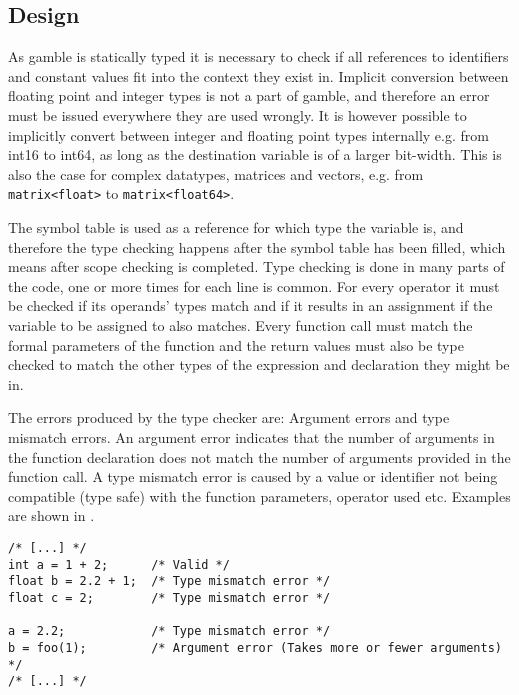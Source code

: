 \subsection*{Design}
As \gls{gamble} is statically typed it is necessary to check if all references to identifiers and constant values fit into the context they exist in. 
Implicit conversion between floating point and integer types is not a part of \gls{gamble}, and therefore an error must be issued everywhere they are used wrongly. 
It is however possible to implicitly convert between integer and floating point types internally e.g. from int16 to int64, as long as the destination variable is of a larger bit-width.
This is also the case for complex datatypes, matrices and vectors, e.g. from \texttt{matrix<float>} to \texttt{matrix<float64>}. 

The symbol table is used as a reference for which type the variable is, and therefore the type checking happens after the symbol table has been filled, which means after scope checking is completed. 
Type checking is done in many parts of the code, one or more times for each line is common. 
For every operator it must be checked if its operands' types match and if it results in an assignment if the variable to be assigned to also matches.
Every function call must match the formal parameters of the function and the return values must also be type checked to match the other types of the expression and declaration they might be in.

The errors produced by the type checker are: Argument errors and type mismatch errors.
An argument error indicates that the number of arguments in the function declaration does not match the number of arguments provided in the function call.
A type mismatch error is caused by a value or identifier not being compatible (type safe) with the function parameters, operator used etc. 
Examples are shown in .

\begin{lstlisting}[caption=Examples of type errors in \gls{gamble},numbers=none,frame=tlrb,label={lst:typeErrors}]
/* [...] */
int a = 1 + 2;      /* Valid */
float b = 2.2 + 1;  /* Type mismatch error */
float c = 2;        /* Type mismatch error */

a = 2.2;            /* Type mismatch error */
b = foo(1);         /* Argument error (Takes more or fewer arguments) */ 
/* [...] */
\end{lstlisting}

